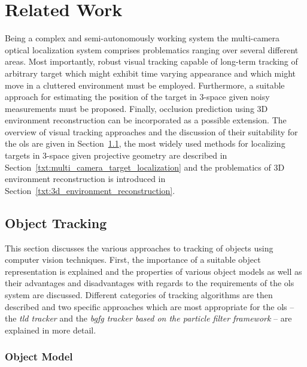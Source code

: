 \chapter{Related Work} \label{txt:related_work}

Being a complex and semi-autonomously working system the multi-camera optical localization system comprises problematics ranging over several different areas. Most importantly, robust visual tracking capable of long-term tracking of arbitrary target which might exhibit time varying appearance and which might move in a cluttered environment must be employed. Furthermore, a suitable approach for estimating the position of the target in 3-space given noisy measurements must be proposed. Finally, occlusion prediction using 3D environment reconstruction can be incorporated as a possible extension. The overview of visual tracking approaches and the discussion of their suitability for the \gls{ols} are given in Section~\ref{txt:object_tracking}, the most widely used methods for localizing targets in 3-space given projective geometry are described in Section~\ref{txt:multi_camera_target_localization} and the problematics of 3D environment reconstruction is introduced in Section~\ref{txt:3d_environment_reconstruction}.

\section{Object Tracking} \label{txt:object_tracking}

This section discusses the various approaches to tracking of objects using computer vision techniques. First, the importance of a suitable object representation is explained and the properties of various object models as well as their advantages and disadvantages with regards to the requirements of the \gls{ols} system are discussed. Different categories of tracking algorithms are then described and two specific approaches which are most appropriate for the \gls{ols} -- the \textit{\gls{tld} tracker} and the \textit{\gls{bgfg} tracker based on the particle filter framework} -- are explained in more detail.

\subsection{Object Model} \label{txt:object_model}

